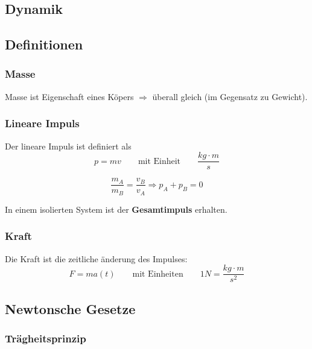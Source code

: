 \documentclass[7pt]{article}
\begin{document}
\begin{multicols*}{3}

\section{Dynamik}

\subsection{Definitionen}

\subsubsection{Masse}

Masse ist Eigenschaft eines K{\"o}pers $\Rightarrow$ {\"u}berall gleich (im Gegensatz zu Gewicht).

\subsubsection{Lineare Impuls}

Der lineare Impuls ist definiert als
\begin{equation*}
	p = mv \qquad\text{mit Einheit}\qquad \frac{kg\cdot m}{s}
\end{equation*}

\begin{equation*}
	\frac{m_A}{m_B} = \frac{v_B}{v_A} \Rightarrow p_A + p_B = 0
\end{equation*}

In einem isolierten System ist der \textbf{Gesamtimpuls} erhalten.

\subsubsection{Kraft}

Die Kraft ist die zeitliche {\"a}nderung des Impulses:
\begin{equation*}
	F = ma(t) \qquad\text{mit Einheiten}\qquad 1N = \frac{kg\cdot m}{s^2}
\end{equation*}

\subsection{Newtonsche Gesetze}

\subsubsection{Tr{\"a}gheitsprinzip}


\end{multicols*}
\end{document}
